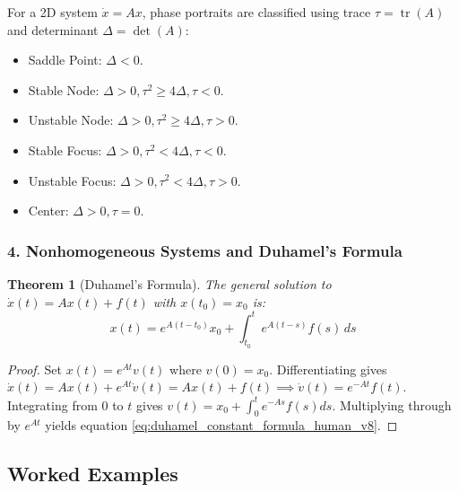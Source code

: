 \documentclass[12pt,a4paper,oneside]{article}
\theoremstyle{definition}
\theoremstyle{plain}
\newtheorem{theorem}{Theorem}[section]
\begin{document}
\vspace{0.15cm}
For a 2D system $\dot{x} = Ax$, phase portraits are classified using trace $\tau = \operatorname{tr}(A)$ and determinant $\Delta = \det(A)$:
\begin{itemize}
    \item Saddle Point: $\Delta < 0$.
    \item Stable Node: $\Delta > 0, \tau^2 \ge 4\Delta, \tau < 0$.
    \item Unstable Node: $\Delta > 0, \tau^2 \ge 4\Delta, \tau > 0$.
    \item Stable Focus: $\Delta > 0, \tau^2 < 4\Delta, \tau < 0$.
    \item Unstable Focus: $\Delta > 0, \tau^2 < 4\Delta, \tau > 0$.
    \item Center: $\Delta > 0, \tau = 0$.
\end{itemize}

\subsubsection{4. Nonhomogeneous Systems and Duhamel's Formula}

\vspace{0.15cm}
\begin{theorem}[Duhamel's Formula]
The general solution to $\dot{x}(t) = A x(t) + f(t)$ with $x(t_0) = x_0$ is:
\begin{equation}
    x(t) = e^{A(t - t_0)} x_0 + \int_{t_0}^t e^{A(t - s)} f(s) \, ds
    \label{eq:duhamel_constant_formula_human_v8}
\end{equation}
\end{theorem}

\begin{proof}
Set $x(t) = e^{At} v(t)$ where $v(0) = x_0$. Differentiating gives $\dot{x}(t) = A x(t) + e^{At} \dot{v}(t) = A x(t) + f(t) \implies \dot{v}(t) = e^{-At} f(t)$. Integrating from $0$ to $t$ gives $v(t) = x_0 + \int_0^t e^{-As} f(s) ds$. Multiplying through by $e^{At}$ yields equation \eqref{eq:duhamel_constant_formula_human_v8}.
\end{proof}

\subsection{Worked Examples}
\end{document}
